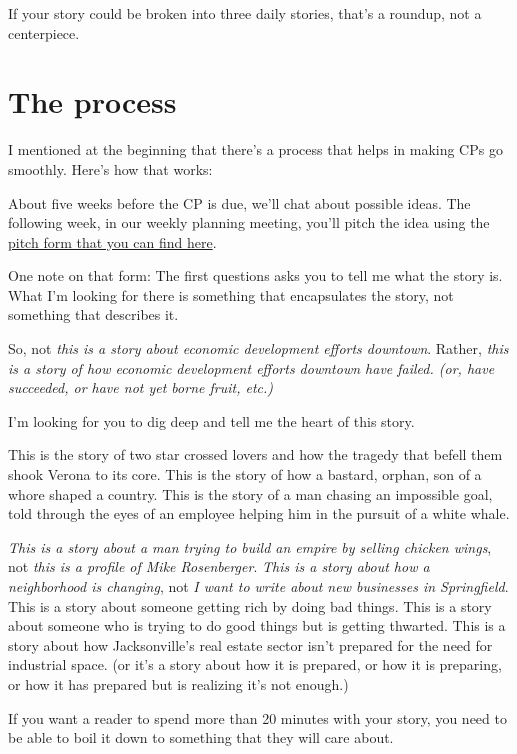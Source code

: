 \documentclass[
  11pt,
  american,
  letterpaperpaper,
  extrafontsizes,onecolumn,openright
  ]{memoir}
\begin{document}
If your story could be broken into three daily stories, that's a roundup, not a centerpiece.

\hypertarget{the-process}{%
\section*{The process}\label{the-process}}

I mentioned at the beginning that there's a process that helps in making CPs go smoothly. Here's how that works:

About five weeks before the CP is due, we'll chat about possible ideas. The following week, in our weekly planning meeting, you'll pitch the idea using the \href{https://bizj.us/1qk3qi}{pitch form that you can find here}.

One note on that form: The first questions asks you to tell me what the story is. What I'm looking for there is something that encapsulates the story, not something that describes it.

So, not \emph{this is a story about economic development efforts downtown}. Rather, \emph{this is a story of how economic development efforts downtown have failed. (or, have succeeded, or have not yet borne fruit, etc.)}

I'm looking for you to dig deep and tell me the heart of this story.

This is the story of two star crossed lovers and how the tragedy that befell them shook Verona to its core. This is the story of how a bastard, orphan, son of a whore shaped a country. This is the story of a man chasing an impossible goal, told through the eyes of an employee helping him in the pursuit of a white whale.

\emph{This is a story about a man trying to build an empire by selling chicken wings}, not \emph{this is a profile of Mike Rosenberger}. \emph{This is a story about how a neighborhood is changing}, not \emph{I want to write about new businesses in Springfield}. This is a story about someone getting rich by doing bad things. This is a story about someone who is trying to do good things but is getting thwarted. This is a story about how Jacksonville's real estate sector isn't prepared for the need for industrial space. (or it's a story about how it is prepared, or how it is preparing, or how it has prepared but is realizing it's not enough.)

If you want a reader to spend more than 20 minutes with your story, you need to be able to boil it down to something that they will care about.
\end{document}
